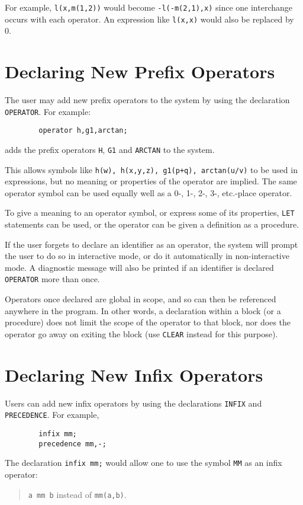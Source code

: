 For example, \texttt{l(x,m(1,2))} would become \texttt{-l(-m(2,1),x)} since one
interchange occurs with each operator.  An expression like \texttt{l(x,x)}
would also be replaced by 0.

\section{Declaring New Prefix Operators}
\hypertarget{command:OPERATOR}{}

The user may add new prefix operators to the system by
using the declaration \texttt{OPERATOR}. For example:
\begin{verbatim}
        operator h,g1,arctan;
\end{verbatim}
adds the prefix operators \texttt{H}, \texttt{G1} and \texttt{ARCTAN} to the system.

This allows symbols like \texttt{h(w), h(x,y,z), g1(p+q), arctan(u/v)} to be
used in expressions, but no meaning or properties of the operator are
implied.  The same operator symbol can be used equally well as a 0-, 1-, 2-,
3-, etc.-place operator.

To give a meaning to an operator symbol, or express some of its
properties, \texttt{LET} statements can be used, or the operator
can be given a definition as a procedure.

If the user forgets to declare an identifier as an operator, the system
will prompt the user to do so in interactive mode, or do it automatically
in non-interactive mode. A diagnostic message will also be printed if an
identifier is declared \texttt{OPERATOR} more than once.

Operators once declared are global in scope, and so can then be referenced
anywhere in the program.  In other words, a declaration within a block (or
a procedure) does not limit the scope of the operator to that block, nor
does the operator go away on exiting the block (use \texttt{CLEAR} instead
for this purpose).


\section{Declaring New Infix Operators}
\hypertarget{command:INFIX}{}
\hypertarget{command:PRECEDENCE}{}

Users can add new infix operators by using the declarations
\texttt{INFIX} and \texttt{PRECEDENCE}.
For example,
\begin{verbatim}
        infix mm;
        precedence mm,-;
\end{verbatim}
The declaration \texttt{infix mm;} would allow one to use the symbol
\texttt{MM} as an infix operator:
\begin{quote}
\hspace{0.2in} \texttt{a mm b} \hspace{0.3in} instead of \hspace{0.3in}
\texttt{mm(a,b)}.
\end{quote}

